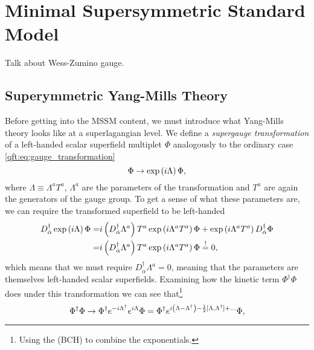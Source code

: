 \documentclass[../main.tex]{subfiles}
\begin{document}
\section{Minimal Supersymmetric Standard Model}

\begin{TODO}
  \item Talk about Wess-Zumino gauge.
\end{TODO}

\subsection{Superymmetric Yang-Mills Theory}
\label{susy:ssec:susy_yang_mills}
Before getting into the MSSM content, we must introduce what Yang-Mills theory
looks like at a superlagangian level. We define a \emph{supergauge
  transformation} of a left-handed scalar superfield multiplet \(\Phi\)
analogously to the ordinary case \cref{qft:eq:gauge_transformation}
\begin{equation}
  \label{susy:eq:supergauge_transformation}
  \Phi \to \operatorname{exp}\left(i \Lambda\right) \Phi,
\end{equation}
where \(\Lambda \equiv \Lambda^a T^a\), \(\Lambda^a\) are the parameters of the transformation and \(T^a\) are again the generators of the gauge group.
To get a sense of what these parameters are, we can require the transformed superfield to be left-handed
\begin{align*}
  D_{\dot{\alpha}}^\dagger \operatorname{exp}\left(i\Lambda\right) \Phi = & i\left(D_{\dot{\alpha}}^\dagger \Lambda^a\right) T^a \operatorname{exp}\left(i\Lambda^a T^a\right) \Phi + \operatorname{exp}\left(i\Lambda^a T^a\right) D_{\dot{\alpha}}^\dagger \Phi \\
  =                                                  & i\left(D_{\dot{\alpha}}^\dagger \Lambda^a\right) T^a \operatorname{exp}\left(i\Lambda^a T^a\right) \Phi \overset{!}{=} 0,
\end{align*}
which means that we must require \(D_{\dot{\alpha}}^\dagger \Lambda^a = 0\), meaning that the parameters are themselves left-handed scalar superfields.
Examining how the kinetic term \(\Phi^\dagger \Phi\) does under this transformation we can see that\footnote{Using the  (BCH) to combine the exponentials.}
\begin{equation}
  \Phi^\dagger \Phi \to \Phi^\dagger e^{-i\Lambda^\dagger} e^{i\Lambda} \Phi = \Phi^\dagger e^{i\left(\Lambda - \Lambda^\dagger\right) - \frac{1}{2} [\Lambda,\Lambda^\dagger] + \ldots} \Phi,
\end{equation}
\end{document}
